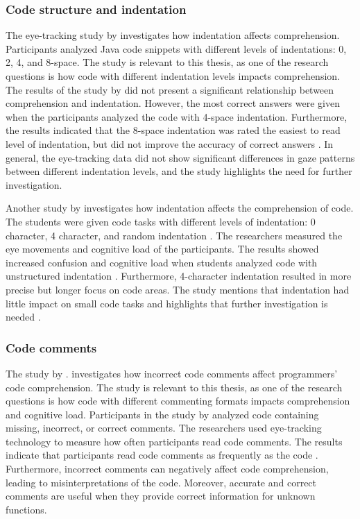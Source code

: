 \subsubsection{Code structure and indentation} 


The eye-tracking study by \citet{bauer2017indentations} investigates how indentation affects comprehension. Participants analyzed Java code snippets with different levels of indentations: 0, 2, 4, and 8-space. The study is relevant to this thesis, as one of the research questions is how code with different  indentation levels impacts comprehension. The results of the study by \citet{bauer2017indentations} did not present a significant relationship between comprehension and indentation. However, the most correct answers were given when the participants analyzed the code with 4-space indentation. Furthermore, the results indicated that the 8-space indentation was rated the easiest to read level of indentation, but did not improve the accuracy of correct answers \cite{bauer2017indentations}. In general, the eye-tracking data did not show significant differences in gaze patterns between different indentation levels, and the study highlights the need for further investigation. 


Another study by \citet{yorimoto2024quantitative} investigates how indentation affects the comprehension of code. The students were given code tasks with different levels of indentation: 0 character, 4 character, and random indentation \cite{yorimoto2024quantitative}. The researchers measured the eye movements and cognitive load of the participants. The results showed increased confusion and cognitive load when students analyzed code with unstructured indentation \cite{yorimoto2024quantitative}. Furthermore, 4-character indentation resulted in more precise but longer focus on code areas. The study mentions that indentation had little impact on small code tasks and highlights that further investigation is needed \cite{yorimoto2024quantitative}.  

\subsubsection{Code comments} 

The study by  \citet{bakhuizen2019comments}. investigates how incorrect code comments affect programmers' code comprehension. The study is relevant to this thesis, as one of the research questions is how code with different  commenting formats impacts comprehension and cognitive load.  Participants in the study by  \citet{bakhuizen2019comments} analyzed code containing missing, incorrect, or correct comments.
The researchers used eye-tracking technology to measure how often participants read code comments. The results indicate that participants read code comments as frequently as the code \cite{bakhuizen2019comments}. Furthermore, incorrect comments can negatively affect code comprehension, leading to misinterpretations of the code. Moreover, accurate and correct comments are useful when they provide correct information for unknown functions. 

